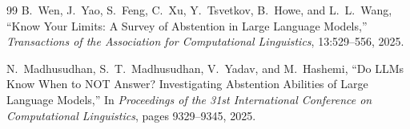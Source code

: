 \documentclass[11pt]{article}
\begin{document}
\begin{thebibliography}{99}
B.~Wen, J.~Yao, S.~Feng, C.~Xu, Y.~Tsvetkov, B.~Howe, and L.~L.~Wang,
\newblock ``Know Your Limits: A Survey of Abstention in Large Language Models,''
\newblock \emph{Transactions of the Association for Computational Linguistics}, 13:529--556, 2025.

N.~Madhusudhan, S.~T.~Madhusudhan, V.~Yadav, and M.~Hashemi,
\newblock ``Do LLMs Know When to NOT Answer? Investigating Abstention Abilities of Large Language Models,''
\newblock In \emph{Proceedings of the 31st International Conference on Computational Linguistics}, pages 9329--9345, 2025.

\end{thebibliography}
\end{document}
